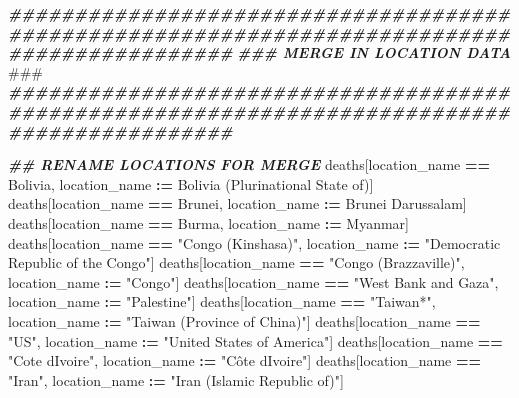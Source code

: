 \documentclass[
]{article}
\newenvironment{Shaded}{\begin{snugshade}}{\end{snugshade}}
\newcommand{\AlertTok}[1]{\textcolor[rgb]{0.94,0.16,0.16}{#1}}
\newcommand{\DocumentationTok}[1]{\textcolor[rgb]{0.56,0.35,0.01}{\textbf{\textit{#1}}}}
\newcommand{\NormalTok}[1]{#1}
\newcommand{\SpecialCharTok}[1]{\textcolor[rgb]{0.81,0.36,0.00}{\textbf{#1}}}
\newcommand{\StringTok}[1]{\textcolor[rgb]{0.31,0.60,0.02}{#1}}
\begin{document}
\begin{Shaded}
\begin{Highlighting}[]
\DocumentationTok{\#\#\#\#\#\#\#\#\#\#\#\#\#\#\#\#\#\#\#\#\#\#\#\#\#\#\#\#\#\#\#\#\#\#\#\#\#\#\#\#\#\#\#\#\#\#\#\#\#\#\#\#\#\#\#\#\#\#\#\#\#\#\#\#\#\#\#\#\#\#\#\#\#\#\#\#\#\#\#\#\#\#\#\#\#\#\#\#\#\#\#\#\#}
\DocumentationTok{\#\#\#                                MERGE IN LOCATION DATA                                 }\AlertTok{\#\#\#}
\DocumentationTok{\#\#\#\#\#\#\#\#\#\#\#\#\#\#\#\#\#\#\#\#\#\#\#\#\#\#\#\#\#\#\#\#\#\#\#\#\#\#\#\#\#\#\#\#\#\#\#\#\#\#\#\#\#\#\#\#\#\#\#\#\#\#\#\#\#\#\#\#\#\#\#\#\#\#\#\#\#\#\#\#\#\#\#\#\#\#\#\#\#\#\#\#\#}

\DocumentationTok{\#\# RENAME LOCATIONS FOR MERGE}
\NormalTok{deaths[location\_name }\SpecialCharTok{==} \StringTok{\textquotesingle{}Bolivia\textquotesingle{}}\NormalTok{, location\_name }\SpecialCharTok{:=} \StringTok{\textquotesingle{}Bolivia (Plurinational State of)\textquotesingle{}}\NormalTok{]}
\NormalTok{deaths[location\_name }\SpecialCharTok{==} \StringTok{\textquotesingle{}Brunei\textquotesingle{}}\NormalTok{, location\_name }\SpecialCharTok{:=} \StringTok{\textquotesingle{}Brunei Darussalam\textquotesingle{}}\NormalTok{]}
\NormalTok{deaths[location\_name }\SpecialCharTok{==} \StringTok{\textquotesingle{}Burma\textquotesingle{}}\NormalTok{, location\_name }\SpecialCharTok{:=} \StringTok{\textquotesingle{}Myanmar\textquotesingle{}}\NormalTok{]}
\NormalTok{deaths[location\_name }\SpecialCharTok{==} \StringTok{"Congo (Kinshasa)"}\NormalTok{, location\_name }\SpecialCharTok{:=} \StringTok{"Democratic Republic of the Congo"}\NormalTok{]}
\NormalTok{deaths[location\_name }\SpecialCharTok{==} \StringTok{"Congo (Brazzaville)"}\NormalTok{, location\_name }\SpecialCharTok{:=} \StringTok{"Congo"}\NormalTok{]}
\NormalTok{deaths[location\_name }\SpecialCharTok{==} \StringTok{"West Bank and Gaza"}\NormalTok{, location\_name }\SpecialCharTok{:=} \StringTok{"Palestine"}\NormalTok{]}
\NormalTok{deaths[location\_name }\SpecialCharTok{==} \StringTok{"Taiwan*"}\NormalTok{, location\_name }\SpecialCharTok{:=} \StringTok{"Taiwan (Province of China)"}\NormalTok{]}
\NormalTok{deaths[location\_name }\SpecialCharTok{==} \StringTok{"US"}\NormalTok{, location\_name }\SpecialCharTok{:=} \StringTok{"United States of America"}\NormalTok{]}
\NormalTok{deaths[location\_name }\SpecialCharTok{==} \StringTok{"Cote d\textquotesingle{}Ivoire"}\NormalTok{, location\_name }\SpecialCharTok{:=} \StringTok{"Côte d\textquotesingle{}Ivoire"}\NormalTok{]}
\NormalTok{deaths[location\_name }\SpecialCharTok{==} \StringTok{"Iran"}\NormalTok{, location\_name }\SpecialCharTok{:=} \StringTok{"Iran (Islamic Republic of)"}\NormalTok{]}

\end{Highlighting}
\end{Shaded}
\end{document}
